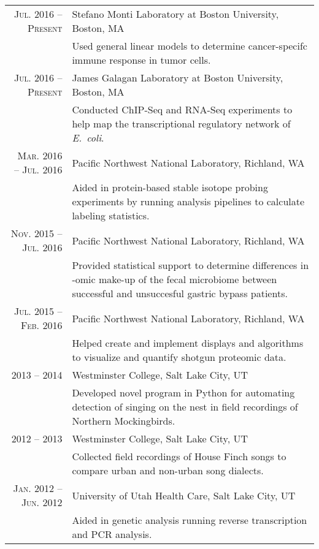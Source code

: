 \documentclass[a4paper,10pt]{article}
\begin{document}
\section{\color{linkcolour}{Research}}
\begin{tabular}{rp{10cm}}
\textsc{Jul. 2016 -- Present} & Stefano Monti Laboratory at Boston University, Boston, MA \\
	& \footnotesize{Used general linear models to determine cancer-specifc immune response in
	  tumor cells.} \\
\textsc{Jul. 2016 -- Present} & James Galagan Laboratory at Boston University, Boston, MA \\
& \footnotesize{Conducted ChIP-Seq and RNA-Seq experiments to help map the transcriptional
	regulatory network of \emph{E.\ coli}.} \\
\textsc{Mar. 2016 -- Jul. 2016} & Pacific Northwest National Laboratory, Richland, WA \\
& \footnotesize{Aided in protein-based stable isotope probing experiments by running analysis pipelines to  calculate labeling statistics.} \\
\textsc{Nov. 2015 -- Jul. 2016} & Pacific Northwest National Laboratory, Richland, WA \\
& \footnotesize{Provided statistical support to determine differences in -omic make-up of the fecal microbiome between successful and unsuccesful gastric bypass patients.} \\
\textsc{Jul. 2015 -- Feb. 2016} & Pacific Northwest National Laboratory, Richland, WA \\
& \footnotesize{Helped create and implement displays and algorithms to visualize and quantify shotgun proteomic data.} \\
 \textsc{2013 -- 2014} & Westminster College, Salt Lake City, UT\\
& \footnotesize{Developed novel program in Python for automating detection of singing on the nest in field recordings of Northern Mockingbirds.}\\
\textsc{2012 -- 2013} & Westminster College, Salt Lake City, UT\\
& \footnotesize{Collected field recordings of House Finch songs to compare urban and non-urban song dialects.}\\
\textsc{Jan. 2012 -- Jun. 2012} & University of Utah Health Care, Salt Lake City, UT
\\& \footnotesize{Aided in genetic analysis running reverse transcription and PCR analysis.}
\end{tabular}
\end{document}
